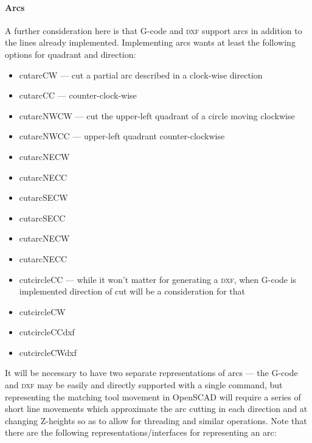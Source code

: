 \documentclass{ltxdoc}
\begin{document}
\paragraph{Arcs}
 
A further consideration here is that G-code and \textsc{dxf} support arcs in addition to the lines already implemented. Implementing arcs wants at least the following options for quadrant and direction:
 
\begin{itemize}
\item cutarcCW --- cut a partial arc described in a clock-wise direction
\item cutarcCC --- counter-clock-wise
\item cutarcNWCW --- cut the upper-left quadrant of a circle moving clockwise
\item cutarcNWCC --- upper-left quadrant counter-clockwise
\item cutarcNECW
\item cutarcNECC
\item cutarcSECW
\item cutarcSECC
\item cutarcNECW
\item cutarcNECC
\item cutcircleCC --- while it won't matter for generating a \textsc{dxf}, when G-code is implemented direction of cut will be a consideration for that
\item cutcircleCW
\item cutcircleCCdxf
\item cutcircleCWdxf
\end{itemize}
 
It will be necessary to have two separate representations of arcs --- the G-code and \textsc{dxf} may be easily and directly supported with a single command, but representing the matching tool movement in OpenSCAD will require a series of short line movements which approximate the arc cutting in each direction and at changing Z-heights so as to allow for threading and similar operations. 
Note that there are the following representations/interfaces for representing an arc:

 
\end{document}
